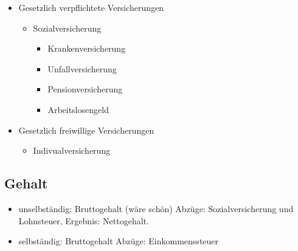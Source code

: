 \documentclass[a4paper]{report}
\begin{document}
\begin{itemize}
\item Gesetzlich verpflichtete Versicherungen
	\begin{itemize}
	\item Sozialversicherung
		\begin{itemize}
		\item Krankenversicherung
		\item Unfallversicherung
		\item Pensionversicherung
		\item Arbeitslosengeld
		\end{itemize}
	\end{itemize}
\item Gesetzlich freiwillige Versicherungen
	\begin{itemize}
	\item Indivualversicherung
	\end{itemize}
\end{itemize}

\subsection{Gehalt}

\begin{itemize}
\item unselbständig: Bruttogehalt (wäre schön) Abzüge: Sozialversicherung und Lohnsteuer, Ergebnis: Nettogehalt.
\item selbständig: Bruttogehalt Abzüge: Einkommenssteuer
\end{itemize}
\end{document}
